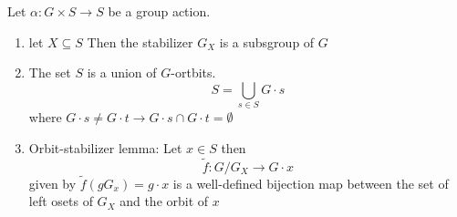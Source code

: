 \documentclass{article}
\begin{document}
\begin{proposition}
    
    Let $\alpha: G \times S \to S$ be a group action. \begin{enumerate}
        \item let $X \subseteq S$ Then the stabilizer $G_X$ is a subsgroup of $G$ 
        \item The set $S$ is a union of $G$-ortbits. $$S = \bigcup_{s \in S} G \cdot s$$ where 
        $G \cdot s \not = G \cdot t \longrightarrow G \cdot s \cap G \cdot t = \emptyset$
        \item Orbit-stabilizer lemma: Let $x \in S$ then $$\tilde{f}: G/ G_X \to G \cdot x $$ given by $\tilde{f}(gG_x) = g \cdot x$ is a well-defined bijection map between the set of left osets of $G_X$ and the orbit of $x$ 
        
    \end{enumerate}
\end{proposition}
\end{document}
